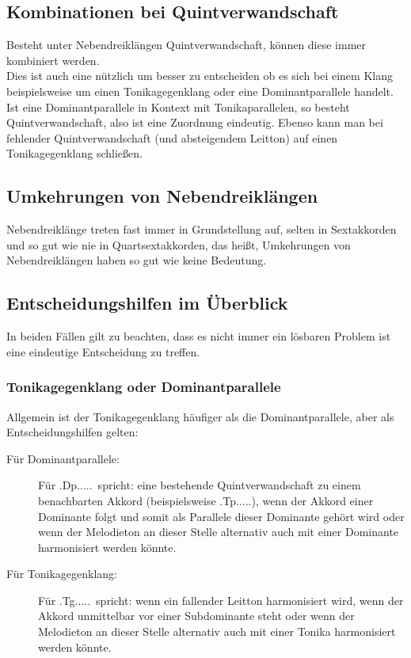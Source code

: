 \documentclass[a4paper]{article}
\newcommand{\Tp}{\HH.Tp.....}
\newcommand{\Tg}{\HH.Tg.....}
\newcommand{\Dp}{\HH.Dp.....}
\begin{document}
	\subsection{Kombinationen bei Quintverwandschaft}
	Besteht unter Nebendreiklängen Quintverwandschaft, können diese immer kombiniert werden.\\
	Dies ist auch eine nützlich um besser zu entscheiden ob es sich bei einem Klang beispielsweise um einen Tonikagegenklang oder eine Dominantparallele handelt. Ist eine Dominantparallele in Kontext mit Tonikaparallelen, so besteht Quintverwandschaft, also ist eine Zuordnung eindeutig. Ebenso kann man bei fehlender Quintverwandschaft (und absteigendem Leitton) auf einen Tonikagegenklang schließen.
	
	\subsection{Umkehrungen von Nebendreiklängen}
	Nebendreiklänge treten fast immer in Grundstellung auf, selten in Sextakkorden und so gut wie nie in Quartsextakkorden, das heißt, Umkehrungen von Nebendreiklängen haben so gut wie keine Bedeutung.
	
	\subsection{Entscheidungshilfen im Überblick}
	In beiden Fällen gilt zu beachten, dass es nicht immer ein lösbaren Problem ist eine eindeutige Entscheidung zu treffen.
	\subsubsection{Tonikagegenklang oder Dominantparallele}
	Allgemein ist der Tonikagegenklang häufiger als die Dominantparallele, aber als Entscheidungshilfen gelten:
	\begin{description}
		\item[Für Dominantparallele:] Für \Dp\ spricht:
			\subitem eine bestehende Quintverwandschaft zu einem benachbarten Akkord (beispielsweise \Tp),
			\subitem wenn der Akkord einer Dominante folgt und somit als Parallele dieser Dominante gehört wird oder
			\subitem wenn der Melodieton an dieser Stelle alternativ auch mit einer Dominante harmonisiert werden könnte.
		\item[Für Tonikagegenklang:] Für \Tg\ spricht:
			\subitem wenn ein fallender Leitton harmonisiert wird,
			\subitem wenn der Akkord unmittelbar vor einer Subdominante steht oder
			\subitem wenn der Melodieton an dieser Stelle alternativ auch mit einer Tonika harmonisiert werden könnte.
	\end{description}
\end{document}
